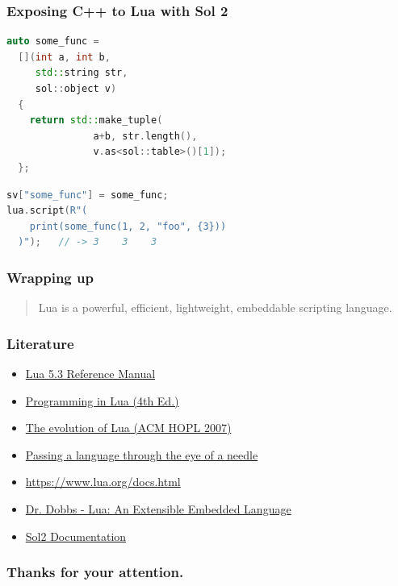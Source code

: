 \documentclass{beamer}
\newif\iftransitions
\begin{document}
\begin{frame}[fragile]
  \frametitle{Exposing C++ to Lua with Sol 2}

  \begin{lstlisting}[language={C++}]
auto some_func =
  [](int a, int b,
     std::string str,
     sol::object v)
  {
    return std::make_tuple(
               a+b, str.length(),
               v.as<sol::table>()[1]);
  };
  \end{lstlisting}
  \iftransitions \pause \fi

  \begin{lstlisting}[language={C++}]
sv["some_func"] = some_func;
lua.script(R"(
    print(some_func(1, 2, "foo", {3}))
  )");   // -> 3    3    3  
  \end{lstlisting}
\end{frame}


\begin{frame}
  \frametitle{Wrapping up}

  \begin{quote}Lua is a powerful, efficient, lightweight, embeddable scripting language.\end{quote}
\end{frame}

\begin{frame}
  \frametitle{Literature}

  \begin{itemize}
  \item \href{https://www.lua.org/manual/5.3/}{Lua 5.3 Reference Manual}
  \item \href{https://www.lua.org/pil/}{Programming in Lua (4th Ed.)}
  \item \href{https://www.lua.org/doc/hopl.pdf}{The evolution of Lua (ACM HOPL 2007)}
  \item \href{https://dl.acm.org/citation.cfm?id=1983083}{Passing a language through the eye of a needle}
  \item \href{https://www.lua.org/docs.html}{https://www.lua.org/docs.html}
  \end{itemize}

  \begin{itemize}
  \item \href{http://www.drdobbs.com/open-source/lua-an-extensible-embedded-language/184410014}{Dr. Dobbs - Lua: An Extensible Embedded Language}
  \item \href{http://sol2.readthedocs.io/en/latest/index.html}{Sol2 Documentation}
  \end{itemize}
\end{frame}

\begin{frame}
  \frametitle{Thanks for your attention.}
\end{frame}
\end{document}
